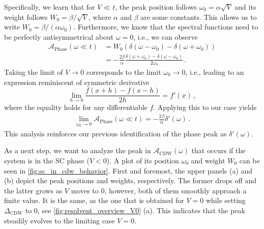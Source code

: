 \documentclass[
    reprint, 
    aps,
    preprintnumbers,
    twocolumn,
    prb,
    superscriptaddress
]{revtex4-2}
\newcommand{\spectral}[1]{\mathcal{A}_\text{#1}  (\omega)}
\begin{document}
Specifically, we learn that for $V \ll t$, the peak position follows $\omega_0 = \alpha \sqrt{V}$ and its weight follows $W_0 = \beta / \sqrt{V}$, 
where $\alpha$ and $\beta$ are some constants.
This allows us to write $W_0 = \beta / (\alpha \omega_0)$. 
Furthermore, we know that the spectral functions need to be perfectly antisymmetrical about $\omega = 0$, i.e., we can observe
\begin{align}
    \mathcal{A}_\text{Phase} (\omega \ll t) &= W_0 (\delta (\omega - \omega_0) - \delta (\omega + \omega_0)) \nonumber \\
        &= - \frac{2\beta}{\alpha} \frac{\delta (\omega + \omega_0) - \delta (\omega - \omega_0)}{2\omega_0} \,.
\end{align} 
Taking the limit of $V \to 0$ corresponds to the limit $\omega_0 \to 0$, i.e., leading to an expression reminiscent of symmetric derivative
\begin{equation}
    \lim_{h \to 0} \frac{f(x + h) - f(x - h)}{2h} = f'(x)\,,
\end{equation}
where the equality holds for any differentiable $f$.
Applying this to our case yields
\begin{align}
    \lim_{\omega_0 \to 0} \mathcal{A}_\text{Phase} (\omega \ll t) = - \frac{2 \beta}{\alpha} \delta'(\omega)\,.
\end{align}
This analysis reinforces our previous identification of the phase peak as $\delta' (\omega)$.


As a next step, we want to analyze the peak in $\spectral{CDW}$ that occurs if the system is in the SC phase ($V<0$).
A plot of its position $\omega_0$ and weight $W_0$ can be seen in \autoref{fig:sc_in_cdw_behavior}.
First and foremost, the upper panels (a) and (b) depict the peak positions and weights, respectively.
The former drops off and the latter grows as $V$ moves to 0, however, both of them smoothly approach a finite value.
It is the same, as the one that is obtained for $V=0$ while setting $\Delta_\text{CDW}$ to 0, see \autoref{fig:resolvent_overview_V0} (a).
This indicates that the peak steadily evolves to the limiting case $V=0$.
\end{document}
